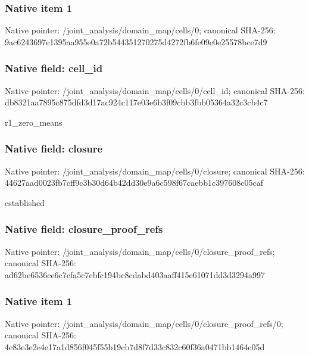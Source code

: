 \documentclass[10pt,a4paper]{article}
\begin{document}
\subsubsection{Native item 1}
Native pointer: /joint\_\allowbreak{}analysis/domain\_\allowbreak{}map/cells/0; canonical SHA-256: 9ac6243697e1395aa955e0a72b544351270275d4272fb6fe09e0e25578bce7d9

\subsubsection{Native field: cell\_\allowbreak{}id}
Native pointer: /joint\_\allowbreak{}analysis/domain\_\allowbreak{}map/cells/0/cell\_\allowbreak{}id; canonical SHA-256: db8321aa7895c875dfd3d17ac924c117e03e6b3f09cbb3fbb05364a32c3cb4c7

\begingroup\raggedright\sloppy r1\_\allowbreak{}zero\_\allowbreak{}means\par\endgroup

\subsubsection{Native field: closure}
Native pointer: /joint\_\allowbreak{}analysis/domain\_\allowbreak{}map/cells/0/closure; canonical SHA-256: 44627aad0023fb7cff9c3b30d64b42dd30e9a6c598f67caebb1c397608c05caf

\begingroup\raggedright\sloppy established\par\endgroup

\subsubsection{Native field: closure\_\allowbreak{}proof\_\allowbreak{}refs}
Native pointer: /joint\_\allowbreak{}analysis/domain\_\allowbreak{}map/cells/0/closure\_\allowbreak{}proof\_\allowbreak{}refs; canonical SHA-256: ad62be6536ce6c7efa5c7cbfc194bc8cdabd403aaff415e61071dd3d3294a997

\subsubsection{Native item 1}
Native pointer: /joint\_\allowbreak{}analysis/domain\_\allowbreak{}map/cells/0/closure\_\allowbreak{}proof\_\allowbreak{}refs/0; canonical SHA-256: 4e83e3e2e4e17a1d856f045f55b19cb7d8f7d33c832c60f36a0471bb1464e05d
\end{document}
